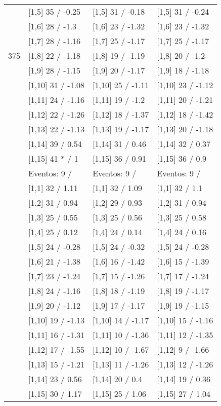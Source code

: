 \begin{table}
\begin{tabular}[t]{llll}
 & {}[1,5] 35  / -0.25 & {}[1,5] 31  / -0.18 & {}[1,5] 31  / -0.24\\
 & {}[1,6] 28  / -1.3 & {}[1,6] 23  / -1.32 & {}[1,6] 23  / -1.32\\
 & {}[1,7] 28  / -1.16 & {}[1,7] 25  / -1.17 & {}[1,7] 25  / -1.17\\
375 & {}[1,8] 22  / -1.18 & {}[1,8] 19  / -1.19 & {}[1,8] 20  / -1.2\\
\addlinespace
 & {}[1,9] 28  / -1.15 & {}[1,9] 20  / -1.17 & {}[1,9] 18  / -1.18\\
 & {}[1,10] 31  / -1.08 & {}[1,10] 25  / -1.11 & {}[1,10] 23  / -1.12\\
 & {}[1,11] 24  / -1.16 & {}[1,11] 19  / -1.2 & {}[1,11] 20  / -1.21\\
 & {}[1,12] 22  / -1.26 & {}[1,12] 18  / -1.37 & {}[1,12] 18  / -1.42\\
 & {}[1,13] 22  / -1.13 & {}[1,13] 19  / -1.17 & {}[1,13] 20  / -1.18\\
\addlinespace
 & {}[1,14] 39  / 0.54 & {}[1,14] 31  / 0.46 & {}[1,14] 32  / 0.37\\
 & {}[1,15] 41 * / 1 & {}[1,15] 36  / 0.91 & {}[1,15] 36  / 0.9\\
 & Eventos:  9 / & Eventos:  9 / & Eventos:  9 /\\
 & {}[1,1] 32  / 1.11 & {}[1,1] 32  / 1.09 & {}[1,1] 32  / 1.1\\
 & {}[1,2] 31  / 0.94 & {}[1,2] 29  / 0.93 & {}[1,2] 31  / 0.94\\
\addlinespace
 & {}[1,3] 25  / 0.55 & {}[1,3] 25  / 0.56 & {}[1,3] 25  / 0.58\\
 & {}[1,4] 25  / 0.12 & {}[1,4] 24  / 0.14 & {}[1,4] 24  / 0.16\\
 & {}[1,5] 24  / -0.28 & {}[1,5] 24  / -0.32 & {}[1,5] 24  / -0.28\\
 & {}[1,6] 21  / -1.38 & {}[1,6] 16  / -1.42 & {}[1,6] 15  / -1.39\\
 & {}[1,7] 23  / -1.24 & {}[1,7] 15  / -1.26 & {}[1,7] 17  / -1.24\\
\addlinespace
500 & {}[1,8] 24  / -1.16 & {}[1,8] 18  / -1.19 & {}[1,8] 19  / -1.17\\
 & {}[1,9] 20  / -1.12 & {}[1,9] 17  / -1.17 & {}[1,9] 19  / -1.15\\
 & {}[1,10] 19  / -1.13 & {}[1,10] 14  / -1.17 & {}[1,10] 15  / -1.16\\
 & {}[1,11] 16  / -1.31 & {}[1,11] 10  / -1.36 & {}[1,11] 12  / -1.35\\
 & {}[1,12] 17  / -1.55 & {}[1,12] 10  / -1.67 & {}[1,12] 9  / -1.66\\
\addlinespace
 & {}[1,13] 15  / -1.21 & {}[1,13] 11  / -1.26 & {}[1,13] 12  / -1.26\\
 & {}[1,14] 23  / 0.56 & {}[1,14] 20  / 0.4 & {}[1,14] 19  / 0.36\\
 & {}[1,15] 30  / 1.17 & {}[1,15] 25  / 1.06 & {}[1,15] 27  / 1.04\\
\bottomrule
\end{tabular}
\end{table}

